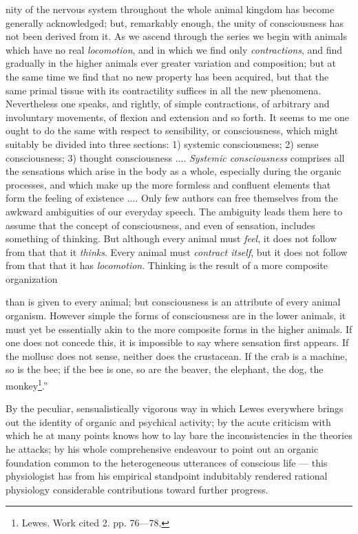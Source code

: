 \documentclass[12pt,a4paper]{book}
\begin{document}
nity of the nervous system throughout the whole animal kingdom has become generally
acknowledged; but, remarkably enough, the unity of consciousness has not been
derived from it. As we ascend through the series we begin with animals which have no
real \emph{locomotion}, and in which we find only \emph{contractions}, and find
gradually in the higher animals ever greater variation and composition; but at the
same time we find that no new property has been acquired, but that the same primal
tissue with its contractility suffices in all the new phenomena. Nevertheless one
speaks, and rightly, of simple contractions, of arbitrary and involuntary movements,
of flexion and extension and so forth. It seems to me one ought to do the same with
respect to sensibility, or consciousness, which might suitably be divided into three
sections: 1) systemic consciousness; 2) sense consciousness; 3) thought
consciousness .... \emph{Systemic consciousness} comprises all the sensations which
arise in the body as a whole, especially during the organic processes, and which make
up the more formless and confluent elements that form the feeling of existence ....
Only few authors can free themselves from the awkward ambiguities of our everyday
speech. The ambiguity leads them here to assume that the concept of consciousness,
and even of sensation, includes something of thinking. But although every animal must
\emph{feel}, it does not follow from that that it \emph{thinks}. Every animal must
\emph{contract itself}, but it does not follow from that that it has
\emph{locomotion}. Thinking is the result of a more composite organization

\setcounter{footnote}{0}
than is given to every animal; but consciousness is an attribute of every animal
organism. However simple the forms of consciousness are in the lower animals, it must
yet be essentially akin to the more composite forms in the higher animals. If one
does not concede this, it is impossible to say where sensation first appears. If the
mollusc does not sense, neither does the crustacean. If the crab is a machine, so is
the bee; if the bee is one, so are the beaver, the elephant, the dog, the
monkey\footnote{Lewes. Work cited 2. pp. 76---78.}.''

By the peculiar, sensualistically vigorous way in which Lewes everywhere brings out
the identity of organic and psychical activity; by the acute criticism with which he
at many points knows how to lay bare the inconsistencies in the theories he attacks;
by his whole comprehensive endeavour to point out an organic foundation common to the
heterogeneous utterances of conscious life --- this physiologist has from his
empirical standpoint indubitably rendered rational physiology considerable
contributions toward further progress.
\end{document}
